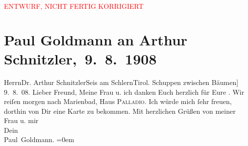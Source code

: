 
\begin{center}
            \textcolor{red}{ENTWURF, NICHT FERTIG KORRIGIERT}
                      \end{center}
            
         
         \renewcommand{\erwaehntePersonen}{Personen: Eva Marie Goldmann}
         \renewcommand{\erwaehnteOrte}{Orte: Berlin, Haus Palladio, Marienbad, Tirol, Villa Heufler}
         \renewcommand{\erwaehnteWerke}{}
               \section[ Paul Goldmann an Arthur Schnitzler, 9. 8. 1908]{ Paul Goldmann an Arthur Schnitzler, 9. 8. 1908}\nopagebreak{}\rehead{ }\begin{ledgroupsized}[t]{13cm}\normalsize\beginnumbering \toendnotes[C]{\smallbreak\pagebreak[2]} 
\toendnotes[C]{\smallbreak}\pstart{}{\pb}Herrn\pend{}\pstart{}Dr. Arthur Schnitzler\pend{}\pstart{}Seis am Schlern\pend{}\pstart{}Tirol.\pend{}{\bigskip}\pstart
           \noindent{}{\pb}{[}Schuppen zwischen Bäumen{]}\pend
           \pstart
           {\pb}9. 8. 08.\pend
           \pstart{}Lieber Freund,\pend\pstart
           Meine Frau u. ich danken
               Euch herzlich für Eure \label{K_L03464-1v}\label{K_L03464-1h}.\pend
           \pstart
           Wir reiſen morgen nach Marienbad, Haus
                     \textsc{Palladio}. Ich würde mich ſehr freuen, dorthin von Dir eine Karte zu bekommen.\pend
           \pstart
           Mit herzlichen Grüßen von meiner Frau u. mir {\\[\baselineskip]}Dein {\\[\baselineskip]}\spacefill\mbox{Paul Goldmann.}\pend
           \leftskip=0em{}
         
         \endnumbering{}\end{ledgroupsized}\begin{anhang}\end{anhang}\newcommand{\dateiname}{L03464}\newcommand{\titel}{Paul Goldmann an Arthur Schnitzler, 9. 8. 1908}\newcommand{\editorInnen}{Martin Anton Müller und Laura Untner}
      